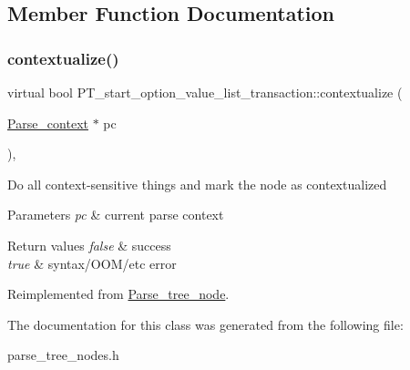 \subsection{Member Function Documentation}
\mbox{\label{classPT__start__option__value__list__transaction_aec9fbcabdc159f19244db60e3ca5d59e}} 
\subsubsection{\texorpdfstring{contextualize()}{contextualize()}}
{\footnotesize\ttfamily virtual bool P\+T\+\_\+start\+\_\+option\+\_\+value\+\_\+list\+\_\+transaction\+::contextualize (\begin{DoxyParamCaption}\item[{\mbox{\hyperlink{structParse__context}{Parse\+\_\+context}} $\ast$}]{pc }\end{DoxyParamCaption})\hspace{0.3cm}{\ttfamily [inline]}, {\ttfamily [virtual]}}

Do all context-\/sensitive things and mark the node as contextualized


\begin{DoxyParams}{Parameters}
{\em pc} & current parse context\\
\hline
\end{DoxyParams}

\begin{DoxyRetVals}{Return values}
{\em false} & success \\
\hline
{\em true} & syntax/\+O\+O\+M/etc error \\
\hline
\end{DoxyRetVals}


Reimplemented from \mbox{\hyperlink{classParse__tree__node_a22d93524a537d0df652d7efa144f23da}{Parse\+\_\+tree\+\_\+node}}.



The documentation for this class was generated from the following file\+:\begin{DoxyCompactItemize}
\item 
parse\+\_\+tree\+\_\+nodes.\+h\end{DoxyCompactItemize}
